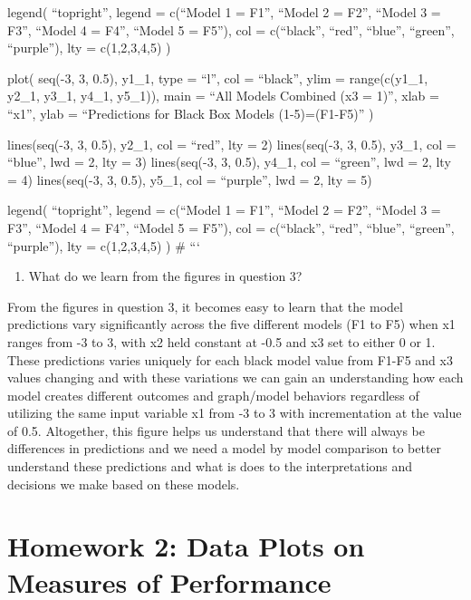 \documentclass[
  letterpaper,
  DIV=11,
  numbers=noendperiod]{scrreprt}
\providecommand{\tightlist}{%
  \setlength{\itemsep}{0pt}\setlength{\parskip}{0pt}}
\begin{document}
legend( ``topright'', legend = c(``Model 1 = F1'', ``Model 2 = F2'',
``Model 3 = F3'', ``Model 4 = F4'', ``Model 5 = F5''), col =
c(``black'', ``red'', ``blue'', ``green'', ``purple''), lty =
c(1,2,3,4,5) )

plot( seq(-3, 3, 0.5), y1\_1, type = ``l'', col = ``black'', ylim =
range(c(y1\_1, y2\_1, y3\_1, y4\_1, y5\_1)), main = ``All Models
Combined (x3 = 1)'', xlab = ``x1'', ylab = ``Predictions for Black Box
Models (1-5)=(F1-F5)'' )

lines(seq(-3, 3, 0.5), y2\_1, col = ``red'', lty = 2) lines(seq(-3, 3,
0.5), y3\_1, col = ``blue'', lwd = 2, lty = 3) lines(seq(-3, 3, 0.5),
y4\_1, col = ``green'', lwd = 2, lty = 4) lines(seq(-3, 3, 0.5), y5\_1,
col = ``purple'', lwd = 2, lty = 5)

legend( ``topright'', legend = c(``Model 1 = F1'', ``Model 2 = F2'',
``Model 3 = F3'', ``Model 4 = F4'', ``Model 5 = F5''), col =
c(``black'', ``red'', ``blue'', ``green'', ``purple''), lty =
c(1,2,3,4,5) ) \# ```

\begin{enumerate}
\def\labelenumi{\arabic{enumi}.}
\setcounter{enumi}{3}
\tightlist
\item
  What do we learn from the figures in question 3?
\end{enumerate}

From the figures in question 3, it becomes easy to learn that the model
predictions vary significantly across the five different models (F1 to
F5) when x1 ranges from -3 to 3, with x2 held constant at -0.5 and x3
set to either 0 or 1. These predictions varies uniquely for each black
model value from F1-F5 and x3 values changing and with these variations
we can gain an understanding how each model creates different outcomes
and graph/model behaviors regardless of utilizing the same input
variable x1 from -3 to 3 with incrementation at the value of 0.5.
Altogether, this figure helps us understand that there will always be
differences in predictions and we need a model by model comparison to
better understand these predictions and what is does to the
interpretations and decisions we make based on these models.


\chapter{Homework 2: Data Plots on Measures of
Performance}\label{homework-2-data-plots-on-measures-of-performance}
\end{document}
